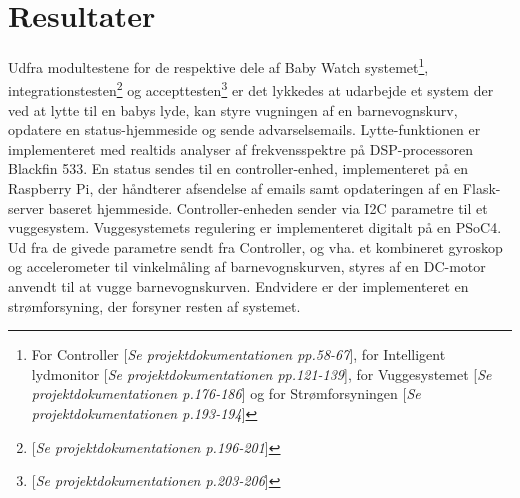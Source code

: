 \chapter{Resultater}

Udfra modultestene for de respektive dele af Baby Watch systemet\footnote{For Controller [\textit{Se projektdokumentationen pp.58-67}], for Intelligent lydmonitor [\textit{Se projektdokumentationen pp.121-139}], for Vuggesystemet [\textit{Se projektdokumentationen p.176-186}] og for Strømforsyningen [\textit{Se projektdokumentationen p.193-194}]}, integrationstesten\footnote{[\textit{Se projektdokumentationen p.196-201}]} og accepttesten\footnote{[\textit{Se projektdokumentationen p.203-206}]} er det lykkedes at udarbejde et system der ved at lytte til en babys lyde, kan styre vugningen af en barnevognskurv, opdatere en status-hjemmeside og sende advarselsemails. Lytte-funktionen er implementeret med realtids analyser af frekvensspektre på DSP-processoren Blackfin 533. En status sendes til en controller-enhed, implementeret på en Raspberry Pi, der håndterer afsendelse af emails samt opdateringen af en Flask-server baseret hjemmeside. Controller-enheden sender via I2C parametre til et vuggesystem. Vuggesystemets regulering er implementeret digitalt på en PSoC4. Ud fra de givede parametre sendt fra Controller, og vha. et kombineret gyroskop og accelerometer til vinkelmåling af barnevognskurven, styres af en DC-motor anvendt til at vugge barnevognskurven. Endvidere er der implementeret en strømforsyning, der forsyner resten af systemet.